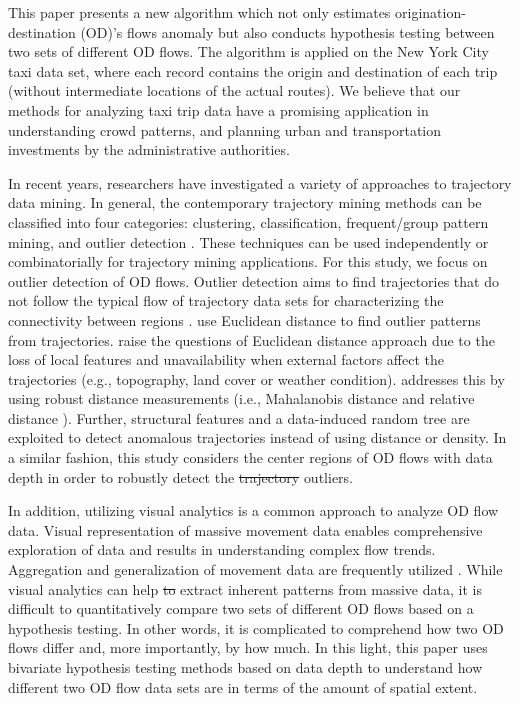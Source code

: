 \documentclass[a4paper,UKenglish]{lipics-v2016}
\providecommand{\DIFadd}[1]{{\protect\color{blue}\uwave{#1}}} %
\providecommand{\DIFdel}[1]{{\protect\color{red}\sout{#1}}}                      %
\providecommand{\DIFaddbegin}{} %
\providecommand{\DIFaddend}{} %
\providecommand{\DIFdelbegin}{} %
\providecommand{\DIFdelend}{} %
\begin{document}
This paper presents a new algorithm which not only estimates origination-destination (OD)'s flows anomaly but also conducts hypothesis testing between two sets of different OD flows. The algorithm is applied on the New York City taxi data set, where each record contains the origin and destination of each trip (without intermediate locations of the actual routes).
We believe that our methods for analyzing taxi trip data have a promising application in understanding crowd patterns, and planning urban and transportation investments by the administrative authorities.

In recent years, researchers have investigated a variety of approaches to trajectory data mining.
In general, the contemporary trajectory mining methods can be classified into four categories: clustering, classification, frequent/group pattern mining, and outlier detection \cite{mazimpaka16JOSIS,zheng15ACMTIST}. These techniques can be used independently or combinatorially for trajectory mining applications. For this study, we focus on outlier detection of OD flows. Outlier detection aims to find trajectories that do not follow the typical flow of trajectory data sets for characterizing the connectivity between regions \cite{mazimpaka16JOSIS}. \cite{fontes13GeoInfo,lee08ICDE} use Euclidean distance to find outlier patterns from trajectories. \cite{pan13ACMGIS,liu12IJGIS} raise the questions of Euclidean distance approach due to the loss of local features and unavailability when external factors affect the trajectories (e.g., topography, land cover or weather condition). \cite{pan13ACMGIS,liu12IJGIS} addresses this \DIFaddbegin \DIFadd{issue }\DIFaddend by using robust distance measurements (i.e., Mahalanobis distance \cite{pan13ACMGIS} and relative distance \cite{liu12IJGIS}). Further, structural features \cite{yuan11JCIS} and a data-induced random tree \cite{zhang11UC} are exploited to detect anomalous trajectories instead of using distance or density. In a similar fashion, this study considers the center regions of OD flows with data depth in order to robustly detect the \DIFdelbegin \DIFdel{trajectory }\DIFdelend \DIFaddbegin \DIFadd{OD flow }\DIFaddend outliers. 

In addition, utilizing visual analytics is a common approach to analyze OD flow data.
Visual representation of massive movement data enables comprehensive exploration of data and results in understanding complex flow trends.
Aggregation and generalization of movement data are frequently utilized \cite{andrienko08VAST,adrienko11IEEETVCG,guo14IEEETVCG}.
While visual analytics can help \DIFdelbegin \DIFdel{to }\DIFdelend extract inherent patterns from massive data, it is difficult to quantitatively compare two sets of different OD flows based on a hypothesis testing.
In other words, it is complicated to comprehend how two OD flows differ and, more importantly, by how much.
In this light, this paper uses bivariate hypothesis testing methods based on data depth to understand how different two OD flow data sets are in terms of the amount of spatial extent. 
\end{document}
